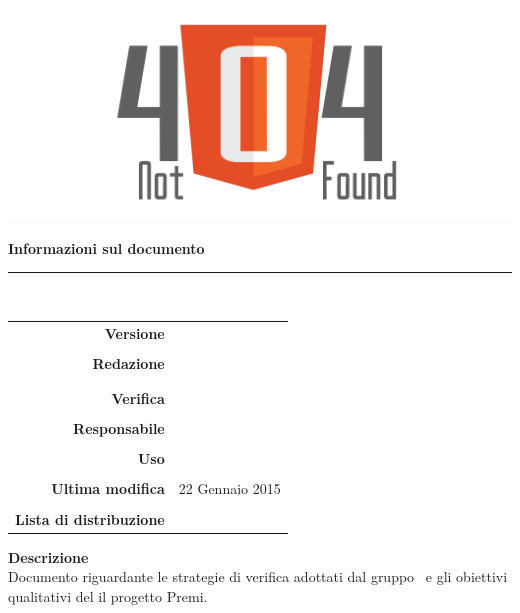 \thispagestyle{empty}

\begin{titlepage}
	\begin{center}
	\begin{Huge}
		\textbf{\gruppo} \\
	\end{Huge}
	\vspace{0.5cm}
	\begin{Large}
		\textbf{\capitolato}
	\end{Large}
	
	\vspace{1cm}
    
	\includegraphics[scale=0.35]{../logo/logo404_Extends.png}
	\vspace{1cm}
	\begin{Huge}
		\textbf{\titDoc}
	\end{Huge}
	
	\vspace{1cm}
	\textbf{Informazioni sul documento}\\
    \rule{10cm}{.4pt} \\
	\begin{table}[h]
	\begin{center}
	\begin{tabular}{r | l}
		\textbf{Versione} & \versione \\ \\
		\textbf{Redazione} & \CaMa \\
			& \ReAn \\ \\
		\textbf{Verifica} &\DeEn \\ \\
		\textbf{Responsabile} & \VeFe \\ \\
		\textbf{Uso} & \uso \\ \\
		\textbf{Ultima modifica} & 22 Gennaio 2015 \\ \\
		\textbf{Lista di distribuzione} & \gruppo \\ 
	\end{tabular}
	\end{center}
	\end{table}
			\textbf{Descrizione} \\
            Documento riguardante le strategie di verifica adottati dal gruppo \gruppo\ e gli obiettivi qualitativi
            del il progetto Premi.
	\end{center}
\end{titlepage}